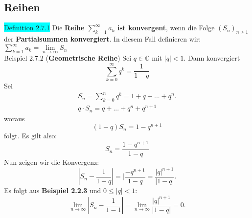 \documentclass[landscape, 10pt]{article}
\newcommand{\C}{\mathbb{C}}
\begin{document}
\begin{multicols}{3}
       \subsection{Reihen}
              \colorbox{cyan}{Definition 2.7.1} 
                     Die \textbf{Reihe 
                     $\sum_{k=1}^\infty a_k$ ist konvergent}, 
                     wenn die Folge 
                     \textcolor{NavyBlue}{$(S_n)_{n\geqslant1}$} 
                     der \textbf{Partialsummen konvergiert}. In 
                     diesem Fall definieren wir: 
                     \textcolor{NavyBlue}{
                     $\sum_{k=1}^\infty a_k
                     =\lim\limits_{n\to\infty}S_n$}\\
              \colorbox{Dandelion}{Beispiel 2.7.2} 
              (\textbf{Geometrische Reihe}) 
                     Sei $q\in\C$ mit 
                     $|q|<1$. Dann konvergiert
                     \begin{equation*}
                            \sum_{k=0}^\infty q^k=\frac{1}{1-q}
                     \end{equation*}
                     Sei 
                     \begin{align*}
                            S_n=\sum_{k=0}^n q^k=1+q+...+q^n.\\
                            q\cdot S_n=q+...+q^n+q^{n+1}
                     \end{align*}
                     woraus
                     \begin{equation*}
                            (1-q)S_n=1-q^{n+1}
                     \end{equation*}
                     folgt. Es gilt also: 
                     \begin{equation*}
                            S_n=\frac{1-q^{n+1}}{1-q}
                     \end{equation*}
                     Nun zeigen wir die Konvergenz: 
                     \begin{equation*}
                            |S_n-\frac{1}{1-q}|
                            =|\frac{-q^{n+1}}{1-q}
                            =\frac{|q|^{n+1}}{|1-q|}.
                     \end{equation*}
                     Es folgt aus
                     \textbf{Beispiel 2.2.3} 
                     und $0\leqslant|q|<1$:
                     \begin{equation*}
                            \lim\limits_{n\to\infty}|S_n-\frac{1}{1-1}|
                            =\lim\limits_{n\to\infty}\frac{|q|^{n+1}}{|1-q|}=0.

\end{equation*}
\end{multicols}
\end{document}
